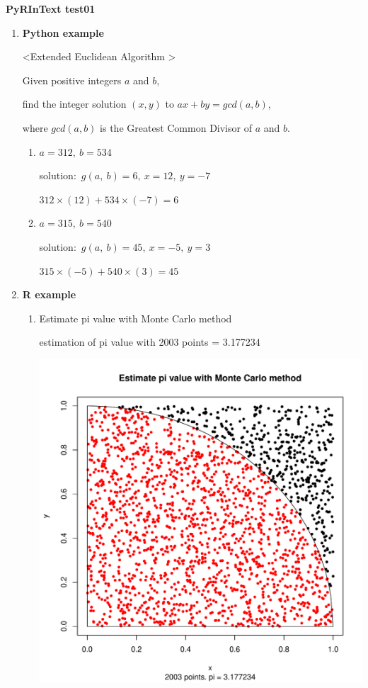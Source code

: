 \documentclass[a4paper]{article}
\begin{document}
	{\Large\bf PyRInText test01} 

	\begin{enumerate}
		\item {\bf Python example}

			\textless Extended Euclidean Algorithm \textgreater\vspace{1mm}\par
			Given positive integers $a$ and $b$,\par
			find the integer solution $(x, y)$ to $ax+by=gcd(a,b)$, \par
			where $gcd(a,b)$ is the Greatest Common Divisor of $a$ and $b$.
			\begin{enumerate}
				\item 
					$a= 312 ,~b= 534$\par
					solution:~$g(a,~b)=6,~x=12,~y=-7$\par
					$312\times(12)+534\times(-7)=6$
				\item 
					$a= 315 ,~b= 540$\par
					{\color{white}
					solution:~$g(a,~b)=45,~x=-5,~y=3$\par
					$315\times(-5)+540\times(3)=45$}

			\end{enumerate}

		\item {\bf R example}

			\begin{enumerate}
				\item Estimate pi value with Monte Carlo method\par
					estimation of pi value with 
						2003 points = 3.177234
					

					\includegraphics[scale=0.40,clip]{mc_pi.pdf}


\end{enumerate}
\end{enumerate}
\end{document}
